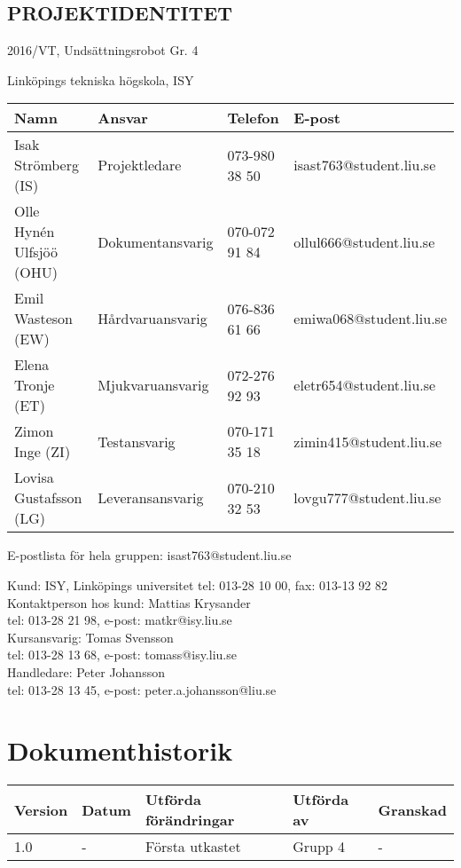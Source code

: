 \documentclass[11pt]{article}
\begin{document}
\pagebreak
\begin{center}

\section*{PROJEKTIDENTITET}
2016/VT, Undsättningsrobot Gr. 4

Linköpings tekniska högskola, ISY
\vspace{5em}

\begin{tabular}{|l|l|l|l|} \hline
\textbf{Namn} & \textbf{Ansvar} & \textbf{Telefon} & \textbf{E-post}  \\ \hline 
Isak Strömberg (IS) & Projektledare & 073-980 38 50 & isast763@student.liu.se \\ \hline
Olle Hynén Ulfsjöö (OHU)& Dokumentansvarig & 070-072 91 84 & ollul666@student.liu.se \\ \hline
Emil Wasteson (EW) & Hårdvaruansvarig & 076-836 61 66 & emiwa068@student.liu.se \\ \hline
Elena Tronje (ET) & Mjukvaruansvarig & 072-276 92 93 & eletr654@student.liu.se \\ \hline
Zimon Inge (ZI)& Testansvarig & 070-171 35 18 & zimin415@student.liu.se \\ \hline
Lovisa Gustafsson (LG) & Leveransansvarig & 070-210 32 53 & lovgu777@student.liu.se \\ \hline
\end{tabular}


E-postlista för hela gruppen: isast763@student.liu.se

\vspace{5em}
Kund: ISY, Linköpings universitet 
tel: 013-28 10 00, fax: 013-13 92 82 \\
Kontaktperson hos kund: Mattias Krysander \\
tel: 013-28 21 98, e-post: matkr@isy.liu.se \\

\vspace{5em}
Kursansvarig:  Tomas Svensson\\
tel: 013-28 13 68, e-post: tomass@isy.liu.se \\
Handledare: Peter Johansson \\
tel: 013-28 13 45, e-post: peter.a.johansson@liu.se
\end{center}
\pagebreak

\tableofcontents

\pagebreak

\section*{Dokumenthistorik}
\begin{table}[h]
\begin{tabular}{|l|l|l|l|l|} \hline

\textbf{Version} & \textbf{Datum} & \textbf{Utförda förändringar} & \textbf{Utförda av} & \textbf{Granskad} \\ \hline
1.0 & - & Första utkastet & Grupp 4 & - \\ \hline
\end{tabular}
\end{table}
\end{document}
